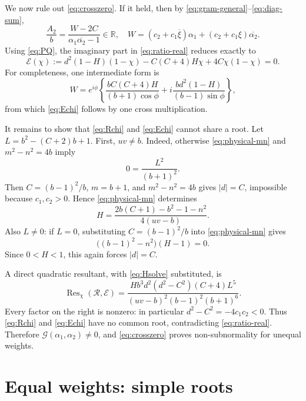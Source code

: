 \documentclass[11pt]{article}
\newcommand{\R}{\mathbb R}
\newcommand{\G}{\mathcal G}
\begin{document}
We now rule out \eqref{eq:crosszero}.  If it held, then by
\eqref{eq:gram-general}--\eqref{eq:diag-sum},
\begin{equation}\label{eq:ratio-real}
 \frac{A_2}{b}=
 \frac{W-2C}{\alpha_1\overline{\alpha_2}-1}\in\R,
 \quad
 W=(c_2+c_1\overline\xi)\alpha_1
 +(c_2+c_1\xi)\overline{\alpha_2}.
\end{equation}
Using \eqref{eq:PQ}, the imaginary part in \eqref{eq:ratio-real}
reduces exactly to
\begin{equation}\label{eq:Echi}
 \mathcal E(\chi):=
 d^2(1-H)(1-\chi)-C(C+4)H\chi+4C\chi(1-\chi)=0.
\end{equation}
For completeness, one intermediate form is
\[
 W=e^{i\phi}\left\{
 \frac{bC(C+4)H}{(b+1)\cos\phi}
 +i\frac{bd^2(1-H)}{(b-1)\sin\phi}\right\},
\]
from which \eqref{eq:Echi} follows by one cross multiplication.

It remains to show that \eqref{eq:Rchi} and \eqref{eq:Echi} cannot share
a root.  Let $L=b^2-(C+2)b+1$.  First, $uv\ne b$.  Indeed, otherwise
\eqref{eq:physical-mn} and $m^2-n^2=4b$ imply
\[
 0=\frac{L^2}{(b+1)^2}.
\]
Then $C=(b-1)^2/b$, $m=b+1$, and $m^2-n^2=4b$ gives
$|d|=C$, impossible because $c_1,c_2>0$.  Hence
\eqref{eq:physical-mn} determines
\begin{equation}\label{eq:Hsolve}
 H=\frac{2b(C+1)-b^2-1-n^2}{4(uv-b)}.
\end{equation}
Also $L\ne0$: if $L=0$, substituting $C=(b-1)^2/b$ into
\eqref{eq:physical-mn} gives
\[
 \bigl((b-1)^2-n^2\bigr)(H-1)=0.
\]
Since $0<H<1$, this again forces $|d|=C$.

A direct quadratic resultant, with \eqref{eq:Hsolve} substituted, is
\begin{equation}\label{eq:resultant}
 \operatorname{Res}_{\chi}(\mathcal R,\mathcal E)
 =\frac{H b^3d^2(d^2-C^2)(C+4)L^5}
 {(uv-b)^2(b-1)^2(b+1)^6}.
\end{equation}
Every factor on the right is nonzero: in particular
$d^2-C^2=-4c_1c_2<0$.  Thus \eqref{eq:Rchi} and
\eqref{eq:Echi} have no common root, contradicting
\eqref{eq:ratio-real}.  Therefore $\G(\alpha_1,\alpha_2)\ne0$, and
\eqref{eq:crosszero} proves non-subnormality for unequal weights.

\section{Equal weights: simple roots}
\end{document}
